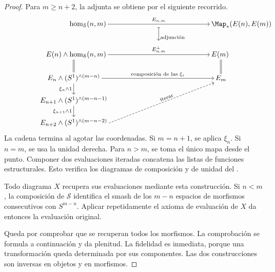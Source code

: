 \begin{proof}
Para $m\geq n+2$, la adjunta se obtiene por el siguiente recorrido.
\[
\begin{tikzcd}[column sep={0mm,between origins},row sep={11mm,between origins},
    cells={nodes={inner sep=2pt}}]
&[16.7mm] |[anchor=east]| \hom_{\mathcal S}(n,m)
    \arrow[rr,start anchor=east,end anchor=west,"E_{n,m}"]
&[25mm] {}\arrow[d,mapsto,start anchor=center,end anchor=center,shorten <=2.5mm,shorten >=6mm,
    "\text{adjunción}"]
&[25mm] |[anchor=west]| \Map_*(E(n),E(m))
&[5.5mm]\\[4mm]
& |[anchor=east]| E(n)\wedge\hom_{\mathcal S}(n,m)
    \arrow[rr,start anchor=east,end anchor=west,"E_{n,m}^\perp"]
    \arrow[dl,equal,start anchor=south,end anchor=north,
      to path={(\tikztostart -| \tikztotarget) -- (\tikztotarget) \tikztonodes}]
& {}
& |[anchor=west]| E(m)
    \arrow[dr,equal,start anchor=south,end anchor=north,
      to path={(\tikztostart -| \tikztotarget) -- (\tikztotarget) \tikztonodes}]
&\\[1.5mm]
E_n\wedge(S^1)^{\wedge(m-n)}
    \arrow[rrrr,"\text{composición de las }\xi_i"{sloped}]
    \arrow[d,"\xi_n\wedge1"']
&&&& E_m\\
E_{n+1}\wedge(S^1)^{\wedge(m-n-1)}\arrow[d,"\xi_{n+1}\wedge1"']
&&&&\\
E_{n+2}\wedge(S^1)^{\wedge(m-n-2)}
    \arrow[to=3-5,dashed,start anchor=east,end anchor=south west,"\text{iterar}"{sloped,pos=.56}]
&&&&
\end{tikzcd}
\]
La cadena termina al agotar las coordenadas. Si $m=n+1$, se aplica $\xi_n$. Si $n=m$, se usa la unidad derecha. Para $n>m$, se toma el único mapa desde el punto. Componer dos evaluaciones iteradas concatena las listas de funciones estructurales. Esto verifica los diagramas de composición y de unidad del .

Todo diagrama $X$ recupera sus evaluaciones mediante esta construcción. Si $n<m$, la composición de $\mathcal S$ identifica el smash de los $m-n$ espacios de morfismos consecutivos con $S^{m-n}$. Aplicar repetidamente el axioma de evaluación de $X$ da entonces la evaluación original.

Queda por comprobar que se recuperan todos los morfismos. La comprobación se formula a continuación y da plenitud. La fidelidad es inmediata, porque una transformación queda determinada por sus componentes. Las dos construcciones son inversas en objetos y en morfismos.
\end{proof}

